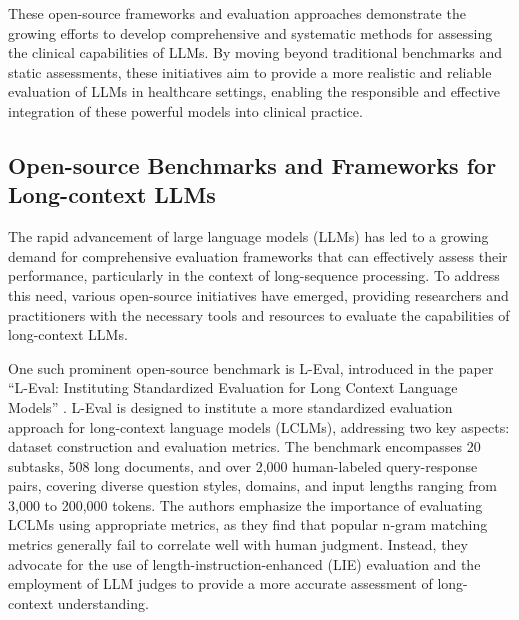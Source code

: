 \documentclass[11pt]{article}
\begin{document}
These open-source frameworks and evaluation approaches demonstrate the growing efforts to develop comprehensive and systematic methods for assessing the clinical capabilities of LLMs. By moving beyond traditional benchmarks and static assessments, these initiatives aim to provide a more realistic and reliable evaluation of LLMs in healthcare settings, enabling the responsible and effective integration of these powerful models into clinical practice.

\subsection{Open-source Benchmarks and Frameworks for Long-context LLMs}

The rapid advancement of large language models (LLMs) has led to a growing demand for comprehensive evaluation frameworks that can effectively assess their performance, particularly in the context of long-sequence processing. To address this need, various open-source initiatives have emerged, providing researchers and practitioners with the necessary tools and resources to evaluate the capabilities of long-context LLMs.

One such prominent open-source benchmark is L-Eval, introduced in the paper ``L-Eval: Instituting Standardized Evaluation for Long Context Language Models'' \cite{ref89}. L-Eval is designed to institute a more standardized evaluation approach for long-context language models (LCLMs), addressing two key aspects: dataset construction and evaluation metrics. The benchmark encompasses 20 subtasks, 508 long documents, and over 2,000 human-labeled query-response pairs, covering diverse question styles, domains, and input lengths ranging from 3,000 to 200,000 tokens. The authors emphasize the importance of evaluating LCLMs using appropriate metrics, as they find that popular n-gram matching metrics generally fail to correlate well with human judgment. Instead, they advocate for the use of length-instruction-enhanced (LIE) evaluation and the employment of LLM judges to provide a more accurate assessment of long-context understanding.
\end{document}
